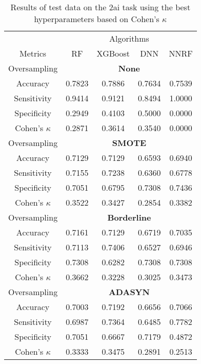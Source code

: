 \begin{table}[!htb]
\centering
\caption{Results of test data on the 2ai task using the best hyperparameters based on Cohen's $\kappa$}
\label{tab:2ai_test_results}
\begin{tabular}{c | c c c c}
\hline
 & \multicolumn{4}{c}{Algorithms}\\ 
Metrics &RF & XGBoost & DNN & NNRF\\ 
\hline
Oversampling &\multicolumn{4}{|c}{\textbf{None}}\\ 
\hline
Accuracy & 0.7823 & 0.7886 & 0.7634 & 0.7539\\ 
Sensitivity & 0.9414 & 0.9121 & 0.8494 & 1.0000\\ 
Specificity & 0.2949 & 0.4103 & 0.5000 & 0.0000\\ 
Cohen's $\kappa$ & 0.2871 & 0.3614 & 0.3540 & 0.0000\\ 
\hline
Oversampling &\multicolumn{4}{|c}{\textbf{SMOTE}}\\ 
\hline
Accuracy & 0.7129 & 0.7129 & 0.6593 & 0.6940\\ 
Sensitivity & 0.7155 & 0.7238 & 0.6360 & 0.6778\\ 
Specificity & 0.7051 & 0.6795 & 0.7308 & 0.7436\\ 
Cohen's $\kappa$ & 0.3522 & 0.3427 & 0.2854 & 0.3382\\ 
\hline
Oversampling &\multicolumn{4}{|c}{\textbf{Borderline}}\\ 
\hline
Accuracy & 0.7161 & 0.7129 & 0.6719 & 0.7035\\ 
Sensitivity & 0.7113 & 0.7406 & 0.6527 & 0.6946\\ 
Specificity & 0.7308 & 0.6282 & 0.7308 & 0.7308\\ 
Cohen's $\kappa$ & 0.3662 & 0.3228 & 0.3025 & 0.3473\\ 
\hline
Oversampling &\multicolumn{4}{|c}{\textbf{ADASYN}}\\ 
\hline
Accuracy & 0.7003 & 0.7192 & 0.6656 & 0.7066\\ 
Sensitivity & 0.6987 & 0.7364 & 0.6485 & 0.7782\\ 
Specificity & 0.7051 & 0.6667 & 0.7179 & 0.4872\\ 
Cohen's $\kappa$ & 0.3333 & 0.3475 & 0.2891 & 0.2513\\ 
\hline
\end{tabular}
\end{table}


